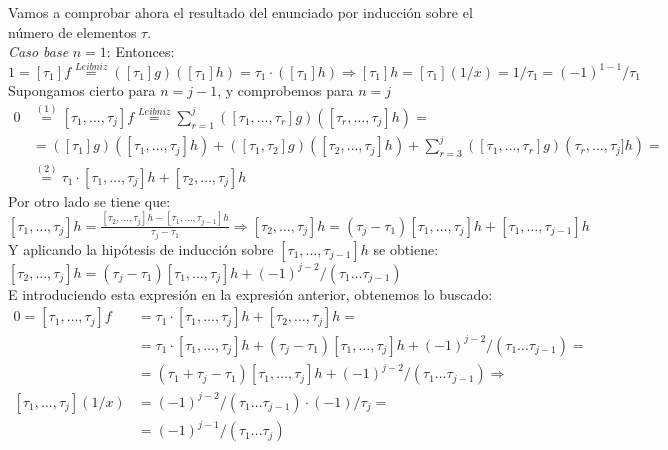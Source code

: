 \documentclass[12pt,a4paper]{article}
\begin{document}
Vamos a comprobar ahora el resultado del enunciado por inducción sobre el
número de elementos $\tau$.\\
\textit{Caso base} $n=1$: Entonces:
$$ 1 = [\tau_1]f \stackrel{Leibniz}{=} ([\tau_1]g)([\tau_1]h) = \tau_1 \cdot
([\tau_1]h) \Longrightarrow [\tau_1]h=[\tau_1](1/x) = 1/\tau_1 =
(-1)^{1-1}/\tau_1$$
Supongamos cierto para $n=j-1$, y comprobemos para $n=j$
\begin{align*}
  0&\stackrel{(1)}{=}[\tau_{1},\dots,\tau_{j}]f\stackrel{Leibniz}{=}\sum\limits^{j}_{r=1}([\tau_1,\dots,\tau_r]g)([\tau_r,\dots,\tau_j]h)=\\
   &=([\tau_1]g)([\tau_1,\dots,\tau_j]h) +
     ([\tau_1,\tau_2]g)([\tau_2,\dots,\tau_j]h) +
     \sum\limits^{j}_{r=3}([\tau_1,\dots,\tau_r]g)(\tau_r,\dots,\tau_j]h)=\\
   &\stackrel{(2)}{=} \tau_1\cdot[\tau_1,\dots,\tau_j]h + [\tau_2,\dots,\tau_j]h 
\end{align*}
Por otro lado se tiene que:\\
$[\tau_1,\dots,\tau_j]h = \frac{[\tau_2,\dots,\tau_j]h -
  [\tau_1,\dots,\tau_{j-1}]h}{\tau_j-\tau_1} \Longrightarrow
[\tau_2,\dots,\tau_j]h = (\tau_j-\tau_1)[\tau_{1},\dots,\tau_{j}]h +
[\tau_1,\dots,\tau_{j-1}]h$\\
Y aplicando la hipótesis de inducción sobre $[\tau_1,\dots,\tau_{j-1}]h$ se
obtiene:\\
$[\tau_2,\dots,\tau_j]h = (\tau_j-\tau_1)[\tau_1,\dots,\tau_j]h +
(-1)^{j-2}/(\tau_1\dots\tau_{j-1})$\\
E introduciendo esta expresión en la expresión anterior, obtenemos lo
buscado:
\begin{align*}
  0 = [\tau_1,\dots,\tau_j]f&=\tau_1\cdot[\tau_1,\dots,\tau_j]h +
                              [\tau_2,\dots,\tau_j]h=\\
                            &=\tau_1\cdot[\tau_1,\dots,\tau_j]h + (\tau_j-\tau_1)[\tau_1,\dots,\tau_j]h +
(-1)^{j-2}/(\tau_1\dots\tau_{j-1}) =\\
  &=(\tau_1+\tau_j-\tau_1)[\tau_1,\dots,\tau_j]h +
    (-1)^{j-2}/(\tau_1\dots\tau_{j-1}) \Longrightarrow\\
[\tau_1,\dots,\tau_j](1/x) &= (-1)^{j-2}/(\tau_1\dots\tau_{j-1}) \cdot
                             (-1)/\tau_j=\\
                             &=(-1)^{j-1}/(\tau_1\dots\tau_{j})
\end{align*}
\end{document}
